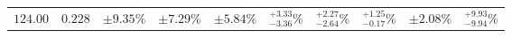 \begin{table}[ht!]
{{\begin{tabular}{| cc | ccc | cccc | c |}
$124.00$ & $0.228$ & $\pm9.35\%$ & {\color{black!55}$\pm 7.29\%$} & {\color{black!55}$\pm 5.84\%$} & $^{+3.33}_{-3.36}\%$ & {\color{black!55}$^{+2.27}_{-2.64}\%$} & {\color{black!55}$^{+1.25}_{-0.17}\%$} & {\color{black!55}$\pm 2.08\%$} & $^{+9.93}_{-9.94}\%$  \\

\end{tabular}}}
\end{table}

